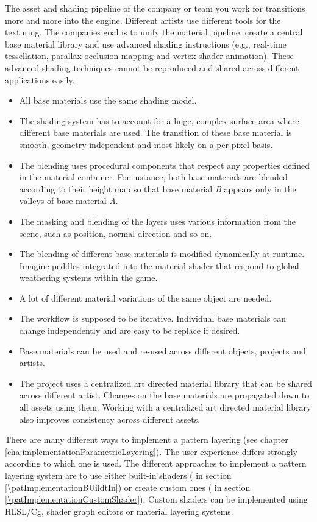 \begin{description}
	The asset and shading pipeline of the company or team you work for transitions more and more into the engine. Different artists use different tools for the texturing. The companies goal is to unify the material pipeline, create a central base material library and use advanced shading instructions (e.g., real-time tessellation, parallax occlusion mapping and vertex shader animation). These advanced shading techniques cannot be reproduced and shared across different applications easily.
	\item[\patApplicability:]\hfill 
	\begin{itemize}\mynobreakpar
		\item All base materials use the same shading model.
		\item The shading system has to account for a huge, complex surface area where different base materials are used. The transition of these base material is smooth, geometry independent and most likely on a per pixel basis.
		\item  The blending uses procedural components that respect any properties defined in the material container. For instance, both base materials are blended according to their height map so that base material \emph{B} appears only in the valleys of base material \emph{A}. 
		\item The masking and blending of the layers uses various information from the scene, such as position, normal direction and so on.
		\item The blending of different base materials is modified dynamically at runtime. Imagine peddles integrated into the material shader that respond to global weathering systems within the game. 
		\item A lot of different material variations of the same object are needed.
		\item The workflow is supposed to be iterative. Individual base materials can change independently and are easy to be replace if desired.
		\item Base materials can be used and re-used across different objects, projects and artists.
		\item The project uses a centralized art directed material library that can be shared across different artist. Changes on the base materials are propagated down to all assets using them. Working with a centralized art directed material library also improves consistency across different assets.    
	\end{itemize}
	\item[\patImplementation:] There are many different ways to implement a pattern layering (see chapter \ref{cha:implementationParametricLayering}). The user experience differs strongly according to which one is used. The different approaches to implement a pattern layering system are to use either built-in shaders (\emph{\patImplementationBUildtIn} in section \ref{\patImplementationBUildtIn}) or  create custom ones (\emph{\patImplementationCustomShader} in section \ref{\patImplementationCustomShader}). Custom shaders can be implemented using HLSL/Cg, shader graph editors or material layering systems.

\end{description}
